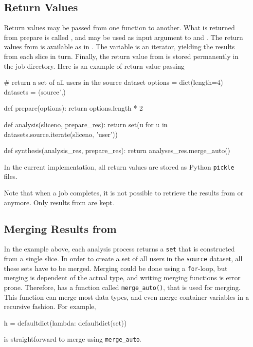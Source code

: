 \subsection{Return Values}
Return values may be passed from one function to another.  What is
returned from prepare is called \prepareres, and may be used as input
argument to \analysis and \synthesis.  The return values from
\analysis is available as \analysisres in \synthesis.  The
\analysisres variable is an iterator, yielding the results from each
slice in turn.  Finally, the return value from \synthesis is stored
permanently in the job directory.  Here is an example of return value
passing
\begin{python}
# return a set of all users in the source dataset
options = dict(length=4)
datasets = (source',)

def prepare(options):
    return options.length * 2

def analysis(sliceno, prepare_res):
    return set(u for u in datasets.source.iterate(sliceno, 'user'))

def synthesis(analysis_res, prepare_res):
     return analyses_res.merge_auto()
\end{python}
In the current implementation, all return values are stored as Python
\texttt{pickle} files.

Note that when a job completes, it is not possible to retrieve the
results from \prepare or \analysis anymore.  Only results from
\synthesis are kept.

\subsection{Merging Results from \analysis}
In the example above, each analysis process returns a \texttt{set}
that is constructed from a single slice.  In order to create a set of
all users in the \texttt{source} dataset, all these sets have to be
merged.  Merging could be done using a \texttt{for}-loop, but merging
is dependent of the actual type, and writing merging functions is
error prone.  Therefore, \analysisres has a function called
\texttt{merge\_auto()}, that is used for merging.  This function can
merge most data types, and even merge container variables in a
recursive fashion.  For example,
\begin{python}
h = defaultdict(lambda: defaultdict(set))
\end{python}
is straightforward to merge using \texttt{merge\_auto}.





